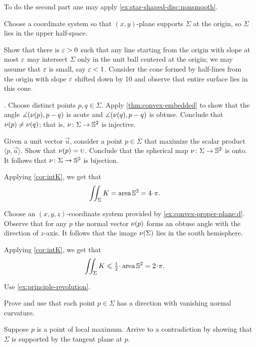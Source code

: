 To do the second part ane may apply \ref{ex:star-shaped-disc:nonsmooth}.


Choose a coordinate system so that $(x,y)$-plane supports $\Sigma$ at the origin, so $\Sigma$ lies in the upper half-space.

Show that there is $\varepsilon>0$ such that any line starting from the origin with slope at most $\varepsilon$ may intersect $\Sigma$ only in the unit ball centered at the origin;
we may assume that $\varepsilon$ is small, say $\varepsilon<1$.
Consider the cone formed by half-lines from the origin with slope $\varepsilon$ shifted down by 10 and observe that entire surface lies in this cone.



\parbf{\ref{ex:intK}}.
Choose distinct points $p,q\in\Sigma$.
Apply \ref{thm:convex-embedded} to show that the angle 
$\measuredangle(\nu(p),p-q)$ is acute and $\measuredangle(\nu(q),p-q)$ is obtuse.
Conclude that $\nu(p)\ne\nu(q)$;
that is, $\nu\colon\Sigma\to\mathbb{S}^2$ is injective.


Given a unit vector $\vec u$, consider a point $p\in \Sigma$ that maximize the scalar product $\langle p,\vec u\rangle$.
Show that $\nu(p)=\text{\sc{u}}$.
Conclude that the spherical map $\nu\colon\Sigma\to\mathbb{S}^2$ is onto.
It follows that $\nu\colon\Sigma\to\mathbb{S}^2$ is bijection.

Applying \ref{cor:intK}, we get that 
\begin{align*}
\iint_\Sigma K
&=\area\mathbb{S}^2=
4\cdot\pi.
\end{align*}

 Choose an $(x,y,z)$-coordinate system provided by \ref{ex:convex-proper-plane:d}.
Observe that for any $p$ the normal vector $\nu(p)$ forms an obtuse angle with the direction of $z$-axis.
It follows that the image $\nu(\Sigma)$ lies in the south hemisphere.

Applying \ref{cor:intK}, we get that 
\begin{align*}
\iint_\Sigma K&\le \tfrac12\cdot\area\mathbb{S}^2=2\cdot\pi.
\end{align*}

 Use \ref{ex:principle-revolution}.

 Prove and use that each point $p\in\Sigma$ has a direction with vanishing normal curvature.

 Suppose $p$ is a point of local maximum.
Arrive to a contradiction by showing that $\Sigma$ is supported by the tangent plane at $p$.


